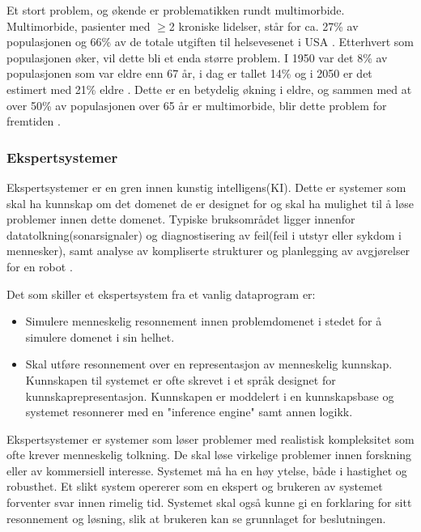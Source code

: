 Et stort problem, og økende  er problematikken rundt multimorbide. Multimorbide, pasienter med $\geq$2 kroniske lidelser, står for ca. 27\% av populasjonen og 66\% av de totale utgiften til helsevesenet i USA \citep{managing_MCC}.  Etterhvert som populasjonen øker, vil dette bli et enda større problem. I 1950 var det 8\% av populasjonen som var eldre enn 67 år, i dag er tallet 14\% og i 2050 er det estimert med 21\% eldre \citep{SSB_dette_er_norge}. Dette er en betydelig økning i eldre, og sammen med at over 50\% av populasjonen over 65 år er multimorbide, blir dette problem for fremtiden \citep[s.178]{OECD_health_reform}.



\subsubsection{Ekspertsystemer}


Ekspertsystemer er en gren innen kunstig intelligens(KI). Dette er systemer som skal ha kunnskap om det domenet de er designet for og skal ha mulighet til å løse problemer innen dette domenet. Typiske bruksområdet ligger innenfor datatolkning(sonarsignaler) og diagnostisering av feil(feil i utstyr eller sykdom i mennesker), samt analyse av kompliserte strukturer og planlegging av avgjørelser for en robot \citep[s.2]{intro_expertsystems}.

Det som skiller et ekspertsystem fra et vanlig dataprogram er:
\begin{itemize}
\item Simulere menneskelig resonnement innen problemdomenet i stedet for å simulere domenet i sin helhet.
\item Skal utføre resonnement over en representasjon av menneskelig kunnskap. Kunnskapen til systemet er ofte skrevet i et språk designet for kunnskaprepresentasjon. Kunnskapen er moddelert i en kunnskapsbase og systemet resonnerer med en "inference engine" samt annen logikk.
\end{itemize}\citep[s.3]{intro_expertsystems} 


Ekspertsystemer er systemer som løser problemer med realistisk kompleksitet som ofte krever menneskelig tolkning. De skal løse virkelige problemer innen forskning eller av kommersiell interesse. Systemet må ha en høy ytelse, både i hastighet og robusthet. Et slikt system opererer som en ekspert og brukeren av systemet forventer svar innen rimelig tid. Systemet skal også kunne gi en forklaring for sitt resonnement og løsning, slik at brukeren kan se grunnlaget for beslutningen\citep[s.3]{intro_expertsystems}.


